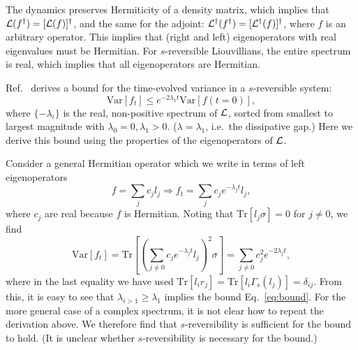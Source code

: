 The  dynamics preserves Hermiticity of a density matrix, which implies that $\mathcal{L}(f^\dagger) = [\mathcal{L}(f)]^\dagger$, and the same for the adjoint: $\mathcal{L}^\dagger(f^\dagger) = [\mathcal{L}^\dagger(f)]^\dagger$, where $f$ is an arbitrary operator. This implies that (right and left) eigenoperators with real eigenvalues must be Hermitian. For $s$-reversible Liouvillians, the entire spectrum is real, which implies that all eigenoperators are Hermitian.

Ref.~\cite{Kastoryano2013} derives a bound for the time-evolved variance in a $s$-reversible system:
\begin{equation} \label{eq:bound}
\text{Var}[ f_t ] \leq e^{ - 2 \lambda_1 t}  \text{Var}[ f(t=0) ],
\end{equation}
where $\{ - \lambda_i \}$ is the real, non-positive spectrum of $\mathcal{L}$, sorted from smallest to largest magnitude with $\lambda_0 =0, \lambda_1 > 0$.   ($\lambda = \lambda_1$, i.e.~the dissipative gap.) Here we derive this bound using the properties of the eigenoperators of $\mathcal{L}$.

Consider a general Hermitian  operator which we write in terms of left eigenoperators
\begin{equation}
f = \sum_j c_j l_j \Rightarrow f_t = \sum_j c_j e^{ - \lambda_j t} l_j,
\end{equation}
where $c_j$ are real because $f$ is Hermitian.
Noting that  $\text{Tr}[l_j \sigma] = 0$ for $j \neq 0$, we find
\begin{equation}
\text{Var}[ f_t ]  =  \text{Tr} \left[  \left(  \sum_{j \neq 0} c_j e^{ - \lambda_j t} l_j \right)^2  \sigma \right] =      \sum_{j \neq 0} c_j^2 e^{ - 2 \lambda_j t},
\end{equation}
where in the last equality we have used $\text{Tr}[l_i r_j] = \text{Tr}[l_i \Gamma_s(l_j)] = \delta_{ij}$. From this, it is easy to see that $\lambda_{i > 1} \geq \lambda_1 $ implies the bound Eq.~\eqref{eq:bound}.  For the more general case of a complex spectrum, it is not clear how to repeat the derivation above. We therefore find that $s$-reversibility is sufficient for the bound to hold. (It is unclear whether $s$-reversibility is necessary for the bound.)

